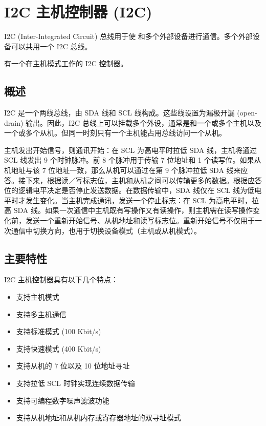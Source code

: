 \documentclass[main\_\_CN.tex]{subfiles}
\begin{document}

\ifglobal
\else
    {\let\clearpage\relax \listoftodos}
    {\let\clearpage\relax \listofdonetodos}
    \tableofcontents
\fi



\hypertarget{i2c}{}
\chapter{I2C 主机控制器 (I2C)}
\label{mod:i2c}



I2C (Inter-Integrated Circuit) 总线用于使 \chipname{} 和多个外部设备进行通信。多个外部设备可以共用一个 I2C 总线。

\chipname{} 有一个在主机模式工作的 I2C 控制器。

\section{概述}
I2C 是一个两线总线，由 SDA 线和 SCL 线构成。这些线设置为漏极开漏 (open-drain) 输出。因此，I2C 总线上可以挂载多个外设，通常是和一个或多个主机以及一个或多个从机。但同一时刻只有一个主机能占用总线访问一个从机。

主机发出开始信号，则通讯开始：在 SCL 为高电平时拉低 SDA 线，主机将通过 SCL 线发出 9 个时钟脉冲。前 8 个脉冲用于传输 7 位地址和 1 个读写位。如果从机地址与该 7 位地址一致，那么从机可以通过在第 9 个脉冲拉低 SDA 线来应答。接下来，根据读／写标志位，主机和从机之间可以传输更多的数据。根据应答位的逻辑电平决定是否停止发送数据。在数据传输中，SDA 线仅在 SCL 线为低电平时才发生变化。当主机完成通讯，发送一个停止标志：在 SCL 为高电平时，拉高 SDA 线。如果一次通信中主机既有写操作又有读操作，则主机需在读写操作变化前，发送一个重新开始信号、从机地址和读写标志位。重新开始信号不仅用于一次通信中切换方向，也用于切换设备模式（主机或从机模式）。

\section{主要特性}

 \chipname{} I2C 主机控制器具有以下几个特点：

\begin{itemize}
    \item 支持主机模式
    \item 支持多主机通信
    \item 支持标准模式 (100 Kbit/s)
    \item 支持快速模式 (400 Kbit/s)
    \item 支持从机的 7 位以及 10 位地址寻址
    \item 支持拉低 SCL 时钟实现连续数据传输
    \item 支持可编程数字噪声滤波功能
    \item 支持从机地址和从机内存或寄存器地址的双寻址模式
\end{itemize}
\end{document}
